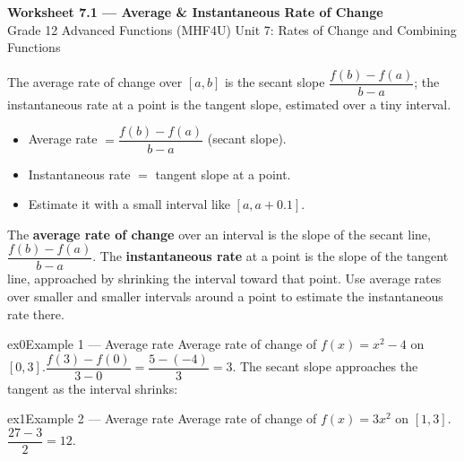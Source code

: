 \documentclass[11pt]{article}
\begin{document}
\begin{center}
{\LARGE\bfseries\color{titleblue}Worksheet 7.1 --- Average \& Instantaneous Rate of Change}\\[2pt]
{\small Grade 12 Advanced Functions (MHF4U) \textperiodcentered{} Unit 7: Rates of Change and Combining Functions}
\end{center}

\begin{ideabox}
The average rate of change over $[a,b]$ is the secant slope $\dfrac{f(b)-f(a)}{b-a}$; the instantaneous rate at a point is the tangent slope, estimated over a tiny interval.
\begin{itemize}[leftmargin=*,itemsep=2pt]
  \item Average rate $=\dfrac{f(b)-f(a)}{b-a}$ (secant slope).
  \item Instantaneous rate $=$ tangent slope at a point.
  \item Estimate it with a small interval like $[a,a+0.1]$.
\end{itemize}
\end{ideabox}

\begin{learnbox}
The \textbf{average rate of change} over an interval is the slope of the secant line, $\dfrac{f(b)-f(a)}{b-a}$.
The \textbf{instantaneous rate} at a point is the slope of the tangent line, approached by shrinking the interval toward that point.
Use average rates over smaller and smaller intervals around a point to estimate the instantaneous rate there.
\end{learnbox}


\begin{example}{ex0}{Example 1 --- Average rate}
Average rate of change of $f(x)=x^2-4$ on $[0,3]$.\soln $\dfrac{f(3)-f(0)}{3-0}=\dfrac{5-(-4)}{3}=3$. The secant slope approaches the tangent as the interval shrinks:
\end{example}

\begin{example}{ex1}{Example 2 --- Average rate}
Average rate of change of $f(x)=3x^2$ on $[1,3]$.\soln $\dfrac{27-3}{2}=12$.
\end{example}
\end{document}
